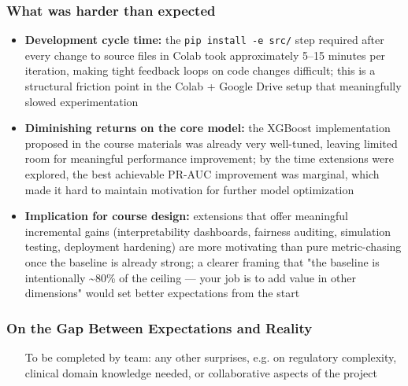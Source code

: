 \documentclass[11pt,a4paper]{article}
\begin{document}
\subsubsection{What was harder than expected}
\begin{itemize}
\item \textbf{Development cycle time:} the \texttt{pip install -e src/} step required after every change to source files in Colab took approximately 5--15 minutes per iteration, making tight feedback loops on code changes difficult; this is a structural friction point in the Colab + Google Drive setup that meaningfully slowed experimentation
\item \textbf{Diminishing returns on the core model:} the XGBoost implementation proposed in the course materials was already very well-tuned, leaving limited room for meaningful performance improvement; by the time extensions were explored, the best achievable PR-AUC improvement was marginal, which made it hard to maintain motivation for further model optimization
\item \textbf{Implication for course design:} extensions that offer meaningful incremental gains (interpretability dashboards, fairness auditing, simulation testing, deployment hardening) are more motivating than pure metric-chasing once the baseline is already strong; a clearer framing that "the baseline is intentionally \textasciitilde{}80\% of the ceiling --- your job is to add value in other dimensions" would set better expectations from the start
\end{itemize}

\subsubsection{On the Gap Between Expectations and Reality}
\begin{itemize}
\item [To be completed by team: any other surprises, e.g. on regulatory complexity, clinical domain knowledge needed, or collaborative aspects of the project]
\end{itemize}
\end{document}
